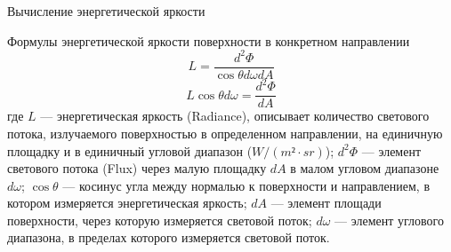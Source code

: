\documentclass{beamer}
\begin{document}
	
	\begin{frame}{Вычисление энергетической яркости}

		Формулы энергетической яркости поверхности в конкретном направлении
		\[
			L = \frac{d^2 \Phi}{\cos \theta d \omega d A}
		\] 
		\[
			L \cos \theta d \omega = \frac{d^2 \Phi}{ d A}
		\] 
		где 
		$L$ --- энергетическая яркость (Radiance), описывает количество светового потока, излучаемого поверхностью в определенном направлении, на единичную площадку и в единичный угловой диапазон ($W/(m²\cdot sr)$);
		$d^2 \Phi$ --- элемент светового потока (Flux) через малую площадку $dA$  в малом угловом диапазоне $d \omega$;
		$\cos \theta$ --- косинус угла между нормалью к поверхности и направлением, в котором измеряется энергетическая яркость;
		$dA$ --- элемент площади поверхности, через которую измеряется световой поток;
		$d \omega$ --- элемент углового диапазона, в пределах которого измеряется световой поток.
		
	\end{frame}
	
\end{document}
